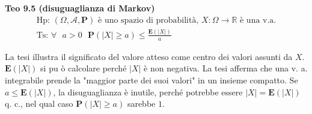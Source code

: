 \documentclass{article}
\begin{document}
\textbf{Teo 9.5 (disuguaglianza di Markov)}%
\begin{gather*}
\text{Hp: }\left( \Omega ,\mathcal{A},\mathbf{P}\right) \text{ \`{e} uno
spazio di probabilit\`{a}, }X:\Omega \rightarrow 
\mathbb{R}
\text{ \`{e} una v.a.} \\
\text{Ts: }\forall \text{ }a>0\text{ }\mathbf{P}\left( \left\vert
X\right\vert \geq a\right) \leq \frac{\mathbf{E}\left( \left\vert
X\right\vert \right) }{a}
\end{gather*}

La tesi illustra il significato del valore atteso come centro dei valori
assunti da $X$. $\mathbf{E}\left( \left\vert X\right\vert \right) $ si pu%
\`{o} calcolare perch\'{e} $\left\vert X\right\vert $ \`{e} non negativa. La
tesi afferma che una v. a. integrabile prende la "maggior parte dei suoi
valori" in un insieme compatto. Se $a\leq \mathbf{E}\left( \left\vert
X\right\vert \right) $, la disuguaglianza \`{e} inutile, perch\'{e} potrebbe
essere $\left\vert X\right\vert =\mathbf{E}\left( \left\vert X\right\vert
\right) $ q. c., nel qual caso $\mathbf{P}\left( \left\vert X\right\vert
\geq a\right) $ sarebbe $1$.
\end{document}
